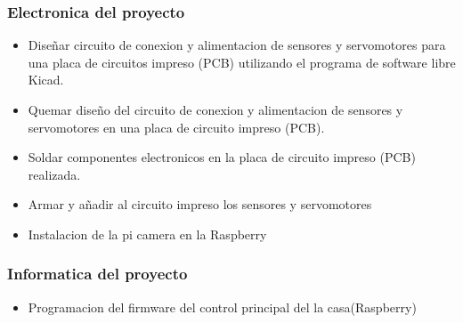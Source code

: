 \documentclass[letterpaper,12pt]{article}
\begin{document}
{		\subsubsection{Electronica del proyecto}
		
		\begin{itemize}
			
			\item Diseñar circuito de conexion y alimentacion de sensores y servomotores para una placa de circuitos impreso (PCB) utilizando el programa de software libre Kicad.
			
			\item Quemar diseño del circuito de conexion y alimentacion de sensores y servomotores en una placa de circuito  impreso (PCB).
			
			\item Soldar componentes electronicos en la placa de circuito impreso (PCB) realizada.
			
			\item Armar y añadir al circuito impreso los sensores y servomotores 
			
			\item Instalacion de la pi camera en la Raspberry
			
		\end{itemize}
		
		
		\subsubsection{Informatica del proyecto}
		
		\begin{itemize}
			\item Programacion del firmware del control principal del la casa(Raspberry)
			

\end{itemize}}
\end{document}
